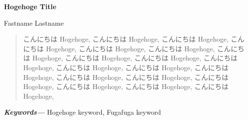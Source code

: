 \renewcommand{\abstractname}{\large Abstract}
\providecommand{\keywords}[1]
{
  \small	
  \textbf{\textit{Keywords---}} #1
}
\thispagestyle{empty}

\begin{center}
    \vspace*{1cm}
    
    \textbf{\Large Hogehoge Title}
    \vspace{1.5cm}
    
    {\large Fastname  Lastname}
    \vspace{1.5cm}    
\end{center}
 
\begin{abstract}
こんにちは Hogehoge, こんにちは Hogehoge, こんにちは Hogehoge, こんにちは Hogehoge, こんにちは Hogehoge, こんにちは Hogehoge, こんにちは Hogehoge, こんにちは Hogehoge, こんにちは Hogehoge, こんにちは Hogehoge, こんにちは Hogehoge, こんにちは Hogehoge, こんにちは Hogehoge, こんにちは Hogehoge, こんにちは Hogehoge, こんにちは Hogehoge, こんにちは Hogehoge, こんにちは Hogehoge, こんにちは Hogehoge, 
\end{abstract}

\keywords{Hogehoge keyword, Fugafuga keyword}
